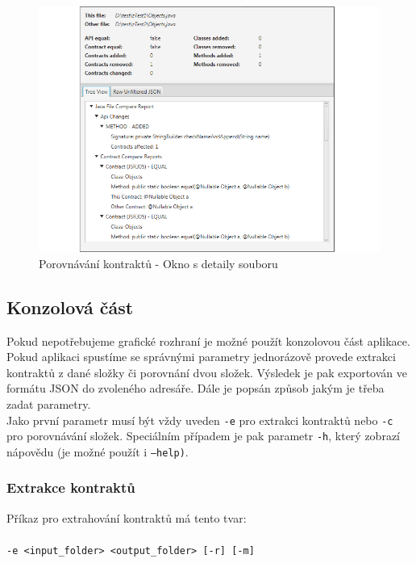 			\begin{figure}[!htb]
					\centering
					\includegraphics[width=1\textwidth]{img/guide07.png}
					\caption[guide07]{Porovnávání kontraktů - Okno s detaily souboru}
					\label{guide07}
				\endminipage\hfill
			\end{figure}		
		
	\subsection{Konzolová část}
		Pokud nepotřebujeme grafické rozhraní je možné použít konzolovou část aplikace. Pokud aplikaci spustíme se správnými parametry jednorázově provede extrakci kontraktů z dané složky či porovnání dvou složek. Výsledek je pak exportován ve formátu JSON do zvoleného adresáře. Dále je popsán způsob jakým je třeba zadat parametry.\\
		
		Jako první parametr musí být vždy uveden \texttt{-e} pro extrakci kontraktů nebo \texttt{-c} pro porovnávání složek. Speciálním případem je pak parametr \texttt{-h}, který zobrazí nápovědu (je možné použít i \texttt{---help)}.
		
		\subsubsection{Extrakce kontraktů}
			Příkaz pro extrahování kontraktů má tento tvar:\\\\
			\- \- \- \texttt{-e <input\_folder> <output\_folder> [-r] [-m]}\\
			

